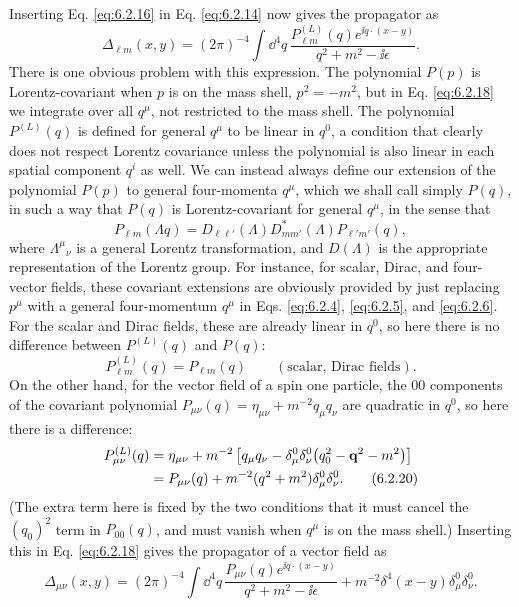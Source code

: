 Inserting Eq. \eqref{eq:6.2.16} in Eq. \eqref{eq:6.2.14} now gives the propagator as
\begin{equation}
\Delta_{\ell m}(x,y)=(2\pi)^{-4}\int \dd^4q\,
 \frac{P_{\ell m}^{(L)}(q)e^{\ii q\cdot(x-y)}}{q^2+m^2-\ii\epsilon}.
\tag{6.2.18}
\label{eq:6.2.18}
\end{equation}
There is one obvious problem with this expression. The polynomial $P(p)$ is
Lorentz-covariant when $p$ is on the mass shell, $p^2=-m^2$, but in Eq.
\eqref{eq:6.2.18} we integrate over all $q^\mu$, not restricted to the mass shell. The
polynomial $P^{(L)}(q)$ is defined for general $q^\mu$ to be linear in $q^0$,
a condition that clearly does not respect Lorentz covariance unless the
polynomial is also linear in each spatial component $q^i$ as well. We can
instead always define our extension of the polynomial $P(p)$ to general
four-momenta $q^\mu$, which we shall call simply $P(q)$, in such a way that
$P(q)$ is Lorentz-covariant for general $q^\mu$, in the sense that
\begin{equation*}
P_{\ell m}(\Lambda q)=D_{\ell\ell'}(\Lambda)
 D^*_{mm'}(\Lambda)P_{\ell'm'}(q),
\end{equation*}
where $\Lambda^\mu{}_{\nu}$ is a general Lorentz transformation, and
$D(\Lambda)$ is the appropriate representation of the Lorentz group. For
instance, for scalar, Dirac, and four-vector fields, these covariant extensions
are obviously provided by just replacing $p^\mu$ with a general four-momentum
$q^\mu$ in Eqs. \eqref{eq:6.2.4}, \eqref{eq:6.2.5}, and \eqref{eq:6.2.6}. For the scalar and Dirac fields,
these are already linear in $q^0$, so here there is no difference between
$P^{(L)}(q)$ and $P(q)$:
\begin{equation}
P_{\ell m}^{(L)}(q)=P_{\ell m}(q)
 \qquad(\text{scalar, Dirac fields}).
\tag{6.2.19}
\label{eq:6.2.19}
\end{equation}
On the other hand, for the vector field of a spin one particle, the 00
components of the covariant polynomial
$P_{\mu\nu}(q)=\eta_{\mu\nu}+m^{-2}q_\mu q_\nu$ are quadratic in $q^0$, so
here there is a difference:
\begin{align}
P_{\mu\nu}^{(L)}(q)
={}&\eta_{\mu\nu}+m^{-2}\left[q_\mu q_\nu
 -\delta_\mu^0\delta_\nu^0\bigl(q_0^2-\mathbf q^2-m^2\bigr)\right]
\notag\\
={}&P_{\mu\nu}(q)+m^{-2}(q^2+m^2)\delta_\mu^0\delta_\nu^0.
\tag{6.2.20}
\label{eq:6.2.20}
\end{align}
(The extra term here is fixed by the two conditions that it must cancel the
$(q_0)^2$ term in $P_{00}(q)$, and must vanish when $q^\mu$ is on the mass
shell.) Inserting this in Eq. \eqref{eq:6.2.18} gives the propagator of a vector field as
\begin{equation}
\Delta_{\mu\nu}(x,y)=(2\pi)^{-4}\int \dd^4q\,
 \frac{P_{\mu\nu}(q)e^{\ii q\cdot(x-y)}}{q^2+m^2-\ii\epsilon}
 +m^{-2}\delta^4(x-y)\delta_\mu^0\delta_\nu^0.
\tag{6.2.21}
\label{eq:6.2.21}
\end{equation}

